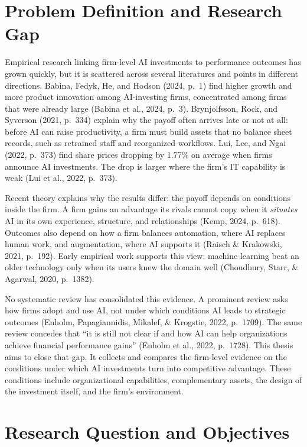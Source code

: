 \documentclass[12pt, a4paper]{article}
\begin{document}
\section{Problem Definition and Research Gap}

Empirical research linking firm-level AI investments to performance outcomes
has grown quickly, but it is scattered across several literatures and points
in different directions. Babina, Fedyk, He, and
Hodson (2024, p.~1) find higher growth and more product innovation among
AI-investing firms, concentrated among firms that were already large (Babina
et al., 2024, p.~3). Brynjolfsson, Rock, and Syverson (2021, p.~334)
explain why the payoff often arrives late or not at all: before AI can raise
productivity, a firm must build assets that no balance sheet records, such as
retrained staff and reorganized workflows. Lui, Lee, and Ngai (2022, p.~373)
find share prices dropping by 1.77\% on average when firms announce AI
investments. The drop is larger where the firm's IT capability is weak (Lui
et al., 2022, p.~373).

Recent theory explains why the results differ: the payoff depends on
conditions inside the firm. A firm gains an advantage its rivals cannot copy
when it \emph{situates} AI in its own experience, structure, and
relationships (Kemp,
2024, p.~618). Outcomes also
depend on how a firm balances automation, where AI replaces human work, and
augmentation, where AI supports it (Raisch
\& Krakowski, 2021, p.~192). Early empirical work supports this view:
machine learning beat an older technology only when its users knew the domain
well (Choudhury, Starr, \& Agarwal, 2020, p.~1382).

No systematic review has consolidated this evidence. A prominent review
asks how firms adopt and use AI, not under which conditions AI leads to
strategic outcomes (Enholm, Papagiannidis, Mikalef, \& Krogstie, 2022,
p.~1709). The same review concedes that ``it is still not
clear if and how AI can help organizations achieve financial performance
gains'' (Enholm et al., 2022, p.~1728). This thesis aims to close that gap. It collects and
compares the firm-level evidence on the conditions under which AI
investments turn into competitive advantage. These conditions include
organizational capabilities, complementary assets, the design of the
investment itself, and the firm's environment.

\section{Research Question and Objectives}
\end{document}
